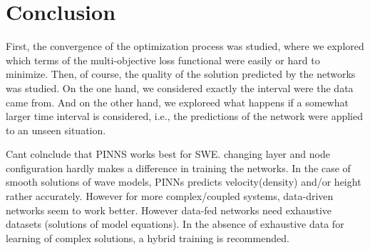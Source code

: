 \section{Conclusion}
\label{sec:conclusion}
First, the convergence of the 
optimization process was studied, where we explored which terms of the multi-objective 
loss functional were easily or hard to minimize. Then, of course, the quality of the solution 
predicted by the networks was studied. On the one hand, we considered exactly the interval were the 
data came from. And on the other hand, we exploreed what happens if a somewhat larger time 
interval is considered, i.e., the predictions of the network were applied to an unseen situation. 

Cant colnclude that PINNS works best for SWE. changing layer and node configuration hardly makes a difference in training the networks. In the case of smooth solutions of wave models, PINNs predicts velocity(density) and/or height rather accurately. However for more complex/coupled systems, data-driven networks seem to work better. However data-fed networks need exhaustive datasets (solutions of model equations). In the absence of exhaustive data for learning of complex solutions, a hybrid training is recommended. 


